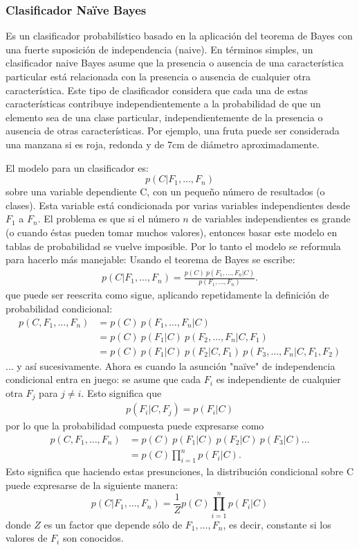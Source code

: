 \subsubsection{Clasificador Na\"{i}ve Bayes}

	Es un clasificador probabilístico basado en la aplicación del teorema de Bayes con una fuerte suposición de independencia (naive). En términos simples, un clasificador naive Bayes asume que la presencia o ausencia de una característica particular está relacionada con la presencia o ausencia de cualquier otra característica. Este tipo de clasificador considera que cada una de estas características contribuye independientemente a la probabilidad de que un elemento sea de una clase particular, independientemente de la presencia o ausencia de otras características. Por ejemplo, una fruta puede ser considerada una manzana si es roja, redonda y de 7cm de diámetro aproximadamente.

	El modelo para un clasificador es:
		$$p(C \vert F_1,\dots,F_n)$$
	sobre una variable dependiente C, con un pequeño número de resultados (o clases). Esta variable está condicionada por varias variables independientes desde $F_1$ a $F_n$. El problema es que si el número $n$ de variables independientes es grande (o cuando éstas pueden tomar muchos valores), entonces basar este modelo en tablas de probabilidad se vuelve imposible. Por lo tanto el modelo se reformula para hacerlo más manejable:
Usando el teorema de Bayes se escribe:
		\begin{align*}
		p(C \vert F_1,\dots,F_n) = \frac{p(C) \ p(F_1,\dots,F_n\vert C)}{p(F_1,\dots,F_n)}.
		\end{align*}
		que puede ser reescrita como sigue, aplicando repetidamente la definición de probabilidad condicional:
		\begin{align}
		p(C, F_1, \dots, F_n)
		&= p(C) \ p(F_1,\dots,F_n\vert C) \\
		&= p(C) \ p(F_1\vert C) \ p(F_2,\dots,F_n\vert C, F_1) \\
		&= p(C) \ p(F_1\vert C) \ p(F_2\vert C, F_1) \ p(F_3,\dots,F_n\vert C, F_1, F_2)
		\end{align}
		... y así sucesivamente. Ahora es cuando la asunción "na\"{i}ve" de independencia condicional entra en juego: se asume que cada $F_i$ es independiente de cualquier otra $F_j$ para $j \neq i$. Esto significa que
		\begin{align*}
		p(F_i \vert C, F_j) = p(F_i \vert C)
		\end{align*}
		por lo que la probabilidad compuesta puede expresarse como
		\begin{align*}
		p(C, F_1, \dots, F_n) 
		&= p(C) \ p(F_1\vert C) \ p(F_2\vert C) \ p(F_3\vert C) \dots \\
		&= p(C) \prod_{i=1}^n p(F_i \vert C).
		\end{align*}
		Esto significa que haciendo estas presunciones, la distribución condicional sobre C puede expresarse de la siguiente manera:
		$$p(C \vert F_1,\dots,F_n) = \frac{1}{Z}p(C)\prod_{i=1}^n p(F_i \vert C)$$
		donde $Z$ es un factor que depende sólo de $F_1,\dots , F_n$, es decir, constante si los valores de $F_i$ son conocidos.
		